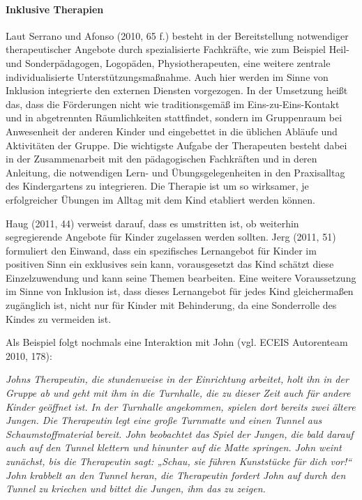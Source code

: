 \paragraph{Inklusive Therapien} Laut Serrano und Afonso (2010, 65 f.) besteht in der Bereitstellung notwendiger therapeutischer Angebote durch spezialisierte Fachkräfte, wie zum Beispiel Heil- und Sonderpädagogen, Logopäden, Physiotherapeuten, eine weitere zentrale individualisierte Unterstützungsmaßnahme. Auch hier werden im Sinne von Inklusion integrierte den externen Diensten vorgezogen. In der Umsetzung heißt das, dass die Förderungen nicht wie traditionsgemäß im Eins-zu-Eins-Kontakt und in abgetrennten Räumlichkeiten stattfindet, sondern im Gruppenraum bei Anwesenheit der anderen Kinder und eingebettet in die üblichen Abläufe und Aktivitäten der Gruppe. Die wichtigste Aufgabe der Therapeuten besteht dabei in der Zusammenarbeit mit den pädagogischen Fachkräften und in deren Anleitung, die notwendigen Lern- und Übungsgelegenheiten in den Praxisalltag des Kindergartens zu integrieren. Die Therapie ist um so wirksamer, je erfolgreicher Übungen im Alltag mit dem Kind etabliert werden können.

Haug (2011, 44) verweist darauf, dass es umstritten ist, ob weiterhin segregierende Angebote für Kinder zugelassen werden sollten. Jerg (2011, 51) formuliert den Einwand, dass ein spezifisches Lernangebot für Kinder im positiven Sinn ein exklusives sein kann, vorausgesetzt das Kind schätzt diese Einzelzuwendung und kann seine Themen bearbeiten. Eine weitere Voraussetzung im Sinne von Inklusion ist, dass dieses Lernangebot für jedes Kind gleichermaßen zugänglich ist, nicht nur für Kinder mit Behinderung, da eine Sonderrolle des Kindes zu vermeiden ist. 

Als Beispiel folgt nochmals eine Interaktion mit John (vgl. ECEIS Autorenteam 2010, 178):

\emph{Johns Therapeutin, die stundenweise in der Einrichtung arbeitet, holt ihn in der Gruppe ab und geht mit ihm in die Turnhalle, die zu dieser Zeit auch für andere Kinder geöffnet ist. In der Turnhalle angekommen, spielen dort bereits zwei ältere Jungen. Die Therapeutin legt eine große Turnmatte und einen Tunnel aus Schaumstoffmaterial bereit. John beobachtet das Spiel der Jungen, die bald darauf auch auf den Tunnel klettern und hinunter auf die Matte springen. John weint zunächst, bis die Therapeutin sagt: „Schau, sie führen Kunststücke für dich vor!“ John krabbelt an den Tunnel heran, die Therapeutin fordert John auf durch den Tunnel zu kriechen und bittet die Jungen, ihm das zu zeigen.}

